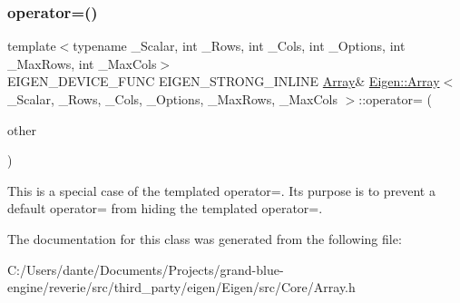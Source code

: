 \subsubsection{\texorpdfstring{operator=()}{operator=()}\hspace{0.1cm}{\footnotesize\ttfamily [4/4]}}
{\footnotesize\ttfamily template$<$typename \+\_\+\+Scalar, int \+\_\+\+Rows, int \+\_\+\+Cols, int \+\_\+\+Options, int \+\_\+\+Max\+Rows, int \+\_\+\+Max\+Cols$>$ \\
E\+I\+G\+E\+N\+\_\+\+D\+E\+V\+I\+C\+E\+\_\+\+F\+U\+NC E\+I\+G\+E\+N\+\_\+\+S\+T\+R\+O\+N\+G\+\_\+\+I\+N\+L\+I\+NE \mbox{\hyperlink{class_eigen_1_1_array}{Array}}\& \mbox{\hyperlink{class_eigen_1_1_array}{Eigen\+::\+Array}}$<$ \+\_\+\+Scalar, \+\_\+\+Rows, \+\_\+\+Cols, \+\_\+\+Options, \+\_\+\+Max\+Rows, \+\_\+\+Max\+Cols $>$\+::operator= (\begin{DoxyParamCaption}\item[{const \mbox{\hyperlink{class_eigen_1_1_array}{Array}}$<$ \+\_\+\+Scalar, \+\_\+\+Rows, \+\_\+\+Cols, \+\_\+\+Options, \+\_\+\+Max\+Rows, \+\_\+\+Max\+Cols $>$ \&}]{other }\end{DoxyParamCaption})\hspace{0.3cm}{\ttfamily [inline]}}

This is a special case of the templated operator=. Its purpose is to prevent a default operator= from hiding the templated operator=. 

The documentation for this class was generated from the following file\+:\begin{DoxyCompactItemize}
\item 
C\+:/\+Users/dante/\+Documents/\+Projects/grand-\/blue-\/engine/reverie/src/third\+\_\+party/eigen/\+Eigen/src/\+Core/Array.\+h\end{DoxyCompactItemize}
